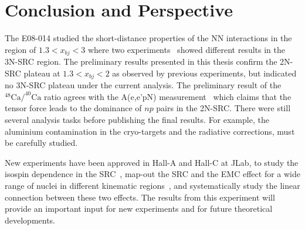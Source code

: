 \chapter{Conclusion and Perspective}
 The E08-014 studied the short-distance properties of the NN interactions in the region of $1.3<x_{bj}<3$ where two experiments~\cite{PhysRevLett.96.082501,PhysRevLett.108.092502} showed different results in the 3N-SRC region. The preliminary results presented in this thesis confirm the 2N-SRC plateau at $1.3<x_{bj}<2$ as observed by previous experiments, but indicated no 3N-SRC plateau under the current analysis. The preliminary result of the $\mathrm{^{48}Ca/^{40}Ca}$ ratio agrees with the A(e,e'pN) measurement~\cite{Subedi:2008zz} which claims that the tensor force leads to the dominance of $np$ pairs in the 2N-SRC. There were still several analysis tasks before publishing the final results. For example, the aluminium contamination in the cryo-targets and the radiative corrections, must be carefully studied.

 New experiments have been approved in Hall-A and Hall-C at JLab, to study the isospin dependence in the SRC~\cite{E12_11_112_pr}, map-out the SRC and the EMC effect for a wide range of nuclei in different kinematic regions~\cite{E12_10_103_pr,E12_06_105_pr,E12_10_008_pr,E12_11_107_pr,E12_10_003_pr}, and systematically study the linear connection between these two effects. The results from this experiment will provide an important input for new experiments and for future theoretical developments.
